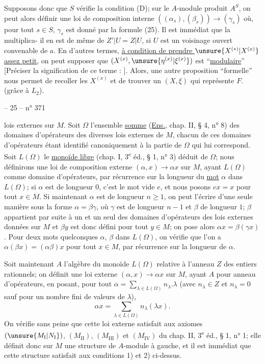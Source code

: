 Supposons donc que $S$ vérifie la condition (D); sur le $A$-module produit $A^S$, on peut alors définir une loi de composition interne $((\alpha_s),(\beta_s))\to(\gamma_s)$ où, pour tout $s\in S$, $\gamma_s$ est donné par la formule (25). Il est immédiat que la multiplica-
il en est de même de $Z'|U=Z|U$, si $U$ est un voisinage ouvert convenable de $a$. En d'autres termes, \uline{à condition de prendre $\unsure{X^{(*)}|X^{(x)}}$ assez petit}, on peut supposer que $(X^{(x)},\unsure{\eta^{(x)}|\xi^{(x)}})$ est ``\uline{modulaire}'' [Préciser la signification de ce terme : ]. Alors, une autre proposition ``formelle'' nous permet de recoller les $X^{(x)}$ et de trouver un $(X,\xi)$ qui représente $F$. (grâce à $L_2$).
\begin{center}-- 25 -- \hfill n° 371\end{center}
lois externes sur $M$. Soit $\Omega$ l'ensemble \uline{somme} (\uline{Ens.}, chap. II, § 4, n° 8) des domaines d'opérateurs des diverses lois externes de $M$, chacun de ces domaines d'opérateurs étant identifié canoniquement à la partie de $\Omega$ qui lui correspond. Soit $L(\Omega)$ le \uline{monoïde libre} (chap. I, 3\textsuperscript{e} éd., § 1, n° 3) déduit de $\Omega$; nous définirons une loi de composition externe $(\alpha,x)\to\alpha x$ sur $M$, ayant $L(\Omega)$ comme domaine d'opérateurs, par récurrence sur la longueur du \uline{mot} $\alpha$ dans $L(\Omega)$; si $\alpha$ est de longueur $0$, c'est le mot vide $e$, et nous posons $ex=x$ pour tout $x\in M$. Si maintenant $\alpha$ est de longueur $n\geq1$, on peut l'écrire d'une seule manière sous la forme $\alpha=\beta\gamma$, où $\gamma$ est de longueur $n-1$ et $\beta$ de longueur $1$; $\beta$ appartient par suite à un et un seul des domaines d'opérateurs des lois externes données sur $M$ et $\beta y$ est donc défini pour tout $y\in M$; on pose alors $\alpha x=\beta(\gamma x)$. Pour deux mots quelconques $\alpha$, $\beta$ dans $L(\Omega)$, on vérifie que l'on a $\alpha(\beta x)=(\alpha\beta)x$ pour tout $x\in M$, par récurrence sur la longueur de $\alpha$.

Soit maintenant $A$ l'algèbre du monoïde $L(\Omega)$ relative à l'anneau $Z$ des entiers rationnels; on définit une loi externe $(\alpha,x)\to\alpha x$ sur $M$, ayant $A$ pour anneau d'opérateurs, en posant, pour tout $\alpha=\sum_{\lambda\in L(\Omega)}n_\lambda.\lambda$ (avec $n_\lambda\in Z$ et $n_\lambda=0$ sauf pour un nombre fini de valeurs de $\lambda$),
\[
\alpha x=\sum_{\lambda\in L(\Omega)}n_\lambda(\lambda x).
\]
On vérifie sans peine que cette loi externe satisfait aux axiomes $(\unsure{M_{\mathrm I}|N_{\mathrm I}})$, $(M_{\mathrm{II}})$, $(M_{\mathrm{III}})$ et $(M_{\mathrm{IV}})$ du chap. II, 3\textsuperscript{e} éd., § 1, n° 1; elle définit donc sur $M$ une structure de $A$-module à gauche, et il est immédiat que cette structure satisfait aux conditions 1) et 2) ci-dessus.

